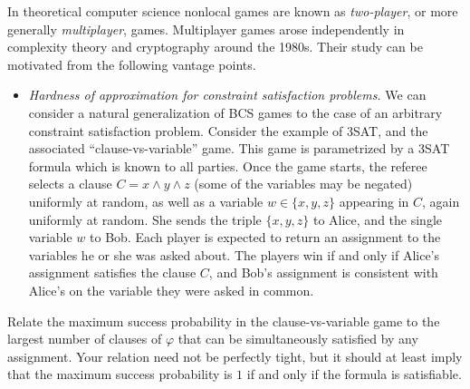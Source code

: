 
In theoretical computer science nonlocal games are known as \emph{two-player}, or more generally \emph{multiplayer}, games. Multiplayer games arose independently in complexity theory and cryptography around the 1980s. 
Their study can be motivated from the following vantage points. 
\begin{itemize}
\item \emph{Hardness of approximation for constraint satisfaction problems.} We can consider a natural generalization of BCS games to the case of an arbitrary constraint satisfaction problem. Consider the example of $3$SAT, and the associated ``clause-vs-variable'' game. This game is parametrized by a $3$SAT formula which is known to all parties. Once the game starts, the referee selects a clause $C = x \wedge y \wedge z$ (some of the variables may be negated) uniformly at random, as well as a variable $w\in\{x,y,z\}$ appearing in $C$, again uniformly at random. She sends the triple $\{x,y,z\}$ to Alice, and the single variable $w$ to Bob. Each player is expected to return an assignment to the variables he or she was asked about. The players win if and only if Alice's assignment satisfies the clause $C$, and Bob's assignment is consistent with Alice's on the variable they were asked in common.\\
\end{itemize}

\begin{exercise}
Relate the maximum success probability in the clause-vs-variable game to the largest number of clauses of $\varphi$ that can be simultaneously satisfied by any assignment. Your relation need not be perfectly tight, but it should at least imply that the maximum success probability is $1$ if and only if the formula is satisfiable. 
\end{exercise}

